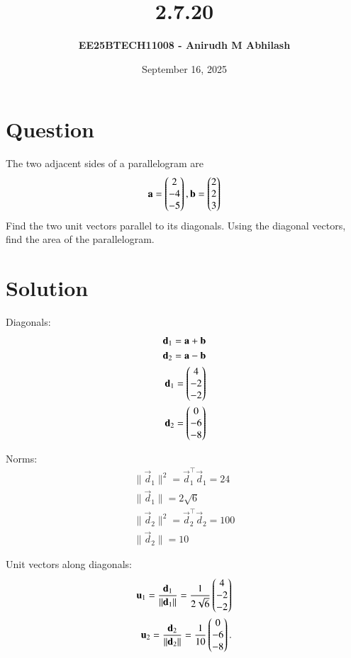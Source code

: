 \documentclass[12pt]{article}
\title{\textbf{2.7.20}}
\author{\textbf{EE25BTECH11008 - Anirudh M Abhilash}}
\date{September 16, 2025}
\begin{document}
\maketitle

\section*{Question}

The two adjacent sides of a parallelogram are 
\begin{align*}
\mathbf{a} = \begin{pmatrix}2 \\ -4 \\ -5\end{pmatrix},  
\mathbf{b} = \begin{pmatrix}2 \\ 2 \\ 3\end{pmatrix}
\end{align*}
Find the two unit vectors parallel to its diagonals. Using the diagonal vectors, find the area of the parallelogram.

\section*{Solution}

Diagonals:
\begin{align}
\mathbf{d}_1 = \mathbf{a} + \mathbf{b} \\
\mathbf{d}_2 = \mathbf{a} - \mathbf{b} \\
\mathbf{d}_1 = \begin{pmatrix}4 \\ -2 \\ -2\end{pmatrix} \\ 
\mathbf{d}_2 = \begin{pmatrix}0 \\ -6 \\ -8\end{pmatrix} 
\end{align}

Norms:
\begin{align}
\|\vec{d}_1\|^2 = \vec{d}_1^\top \vec{d}_1 = 24 \\
\|\vec{d}_1\| = 2\sqrt{6} \\
\|\vec{d}_2\|^2 = \vec{d}_2^\top \vec{d}_2 = 100 \\
\|\vec{d}_2\| = 10
\end{align}

Unit vectors along diagonals:
\begin{align}
\mathbf{u}_1 = \frac{\mathbf{d}_1}{\|\mathbf{d}_1\|}
= \frac{1}{2\sqrt{6}}\begin{pmatrix}4 \\ -2 \\ -2\end{pmatrix} \\
\mathbf{u}_2 = \frac{\mathbf{d}_2}{\|\mathbf{d}_2\|} 
= \frac{1}{10}\begin{pmatrix}0 \\ -6 \\ -8\end{pmatrix}.
\end{align}
\end{document}
